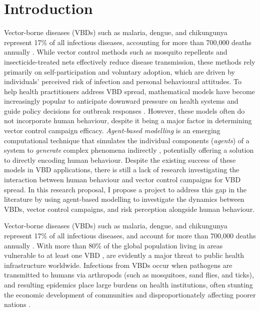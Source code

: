\section{Introduction}


Vector-borne diseases (VBDs) such as malaria, dengue, and chikungunya represent 17\% of all infectious diseases, accounting for more than 700,000 deaths annually \cite{world_health_organisation_who_vector-borne_2020}. While vector control methods such as mosquito repellents and insecticide-treated nets effectively reduce disease transmission, these methods rely primarily on self-participation and voluntary adoption, which are driven by individuals' perceived risk of infection and personal behavioural attitudes. To help health practitioners address VBD spread, mathematical models have become increasingly popular to anticipate downward pressure on health systems and guide policy decisions for outbreak responses \cite{reiner_systematic_2013}. However, these models often do not incorporate human behaviour, despite it being a major factor in determining vector control campaign efficacy. \textit{Agent-based modelling} is an emerging computational technique that simulates the individual components (\textit{agents}) of a system to \textit{generate} complex phenomena indirectly \cite{epstein_growing_1996}, potentially offering a solution to directly encoding human behaviour. Despite the existing success of these models in VBD applications, there is still a lack of research investigating the interaction between human behaviour and vector control campaigns for VBD spread. In this research proposal, I propose a project to address this gap in the literature by using agent-based modelling to investigate the dynamics between VBDs, vector control campaigns, and risk perception alongside human behaviour.

Vector-borne diseases (VBDs) such as malaria, dengue, and chikungunya represent 17\% of all infectious diseases, and account for more than 700,000 deaths annually \cite{world_health_organisation_who_vector-borne_2020}. With more than 80\% of the global population living in areas vulnerable to at least one VBD \cite{golding_integrating_2015},  are evidently a major threat to public health infrastructure worldwide. Infections from VBDs occur when pathogens are transmitted to humans via arthropods (such as mosquitoes, sand flies, and ticks), and resulting epidemics place large burdens on health institutions, often stunting the economic development of communities and disproportionately affecting poorer nations \cite{lum_cost_2009, degroote_interventions_2018}.

